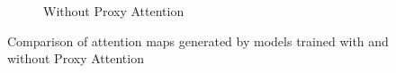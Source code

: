 \begin{figure}[h]
\begin{subfigure}[b]{.7\textwidth}
        \caption{Without Proxy Attention}
        \label{fig:noproxy3}
    \end{subfigure}
    \caption{Comparison of attention maps generated by models trained with and without Proxy Attention}
    \label{fig:attention3}
\end{figure}
